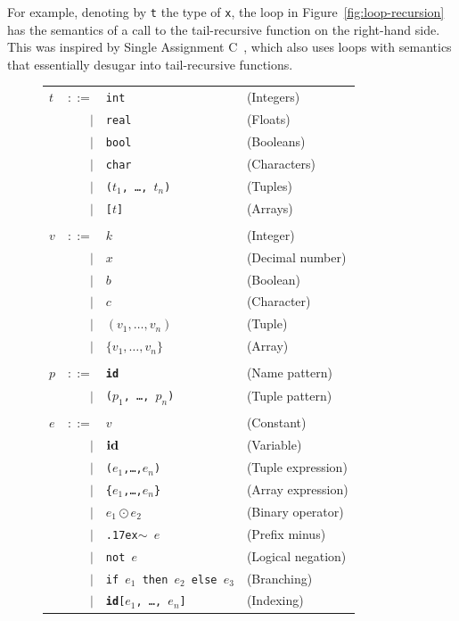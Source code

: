 \documentclass{sigplanconf}  %
\renewcommand\tilde[0]{{\raise.17ex\hbox{$\scriptstyle\sim$}}}
\begin{document}
For example, denoting by {\tt t} the type of {\tt x}, the loop in
Figure~\ref{fig:loop-recursion} has the semantics of a call to the
tail-recursive function on the right-hand side.
%
This was inspired by Single Assignment C~\cite{grelck2006sac}, which
also uses loops with semantics that essentially desugar into
tail-recursive functions.

\begin{figure}[bt]
\begin{tabular}{lrll}
$t$ & $::=$ & {\tt int} & (Integers) \\
& $|$ & {\tt real} & (Floats) \\
& $|$ & {\tt bool} & (Booleans) \\
& $|$ & {\tt char} & (Characters) \\
& $|$ & {\tt ($t_{1}$, \ldots, $t_{n}$)} & (Tuples) \\
& $|$ & {\tt [$t$]} & (Arrays) \\
\\
$v$ & $::=$ & $k$ & (Integer)\\
& $|$ & $x$ & (Decimal number) \\
& $|$ & $b$ & (Boolean)\\
& $|$ & $c$ & (Character)\\
& $|$ & $(v_{1},\ldots,v_{n})$ & (Tuple) \\
& $|$ & $\{v_{1},\ldots,v_{n}\}$ & (Array) \\
\\
$p$ & $::=$ & {\tt {\bf id}} & (Name pattern)\\
& $|$ & {\tt ($p_{1}$, \ldots, $p_{n}$)} & (Tuple pattern) \\
\\
$e$ & $::=$ & $v$ & (Constant)\\
& $|$ & ${\bf id}$ & (Variable)\\
& $|$ & {\tt ($e_{1}$,\ldots,$e_{n}$)} & (Tuple expression) \\
& $|$ & {\tt \{$e_{1}$,\ldots,$e_{n}$\}} & (Array expression) \\
& $|$ & $e_{1} \odot{} e_{2}$ & (Binary operator) \\
& $|$ & {\tt \tilde{} $e$} & (Prefix minus) \\
& $|$ & {\tt not $e$} & (Logical negation) \\
& $|$ & {\tt if $e_{1}$ then $e_{2}$ else $e_{3}$} & (Branching) \\
& $|$ & {\tt {\bf id}[$e_{1}$, \ldots, $e_{n}$]} & (Indexing) \\

\end{tabular}
\end{figure}
\end{document}
